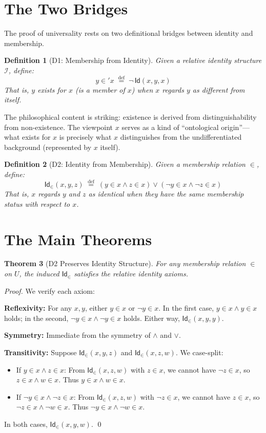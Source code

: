 \documentclass[11pt, a4paper]{article}
\newtheorem{theorem}{Theorem}[section]
\newtheorem{definition}[theorem]{Definition}
\theoremstyle{remark}
\newcommand{\Id}{\mathsf{Id}}
\newcommand{\RI}{\mathcal{I}}
\begin{document}
\section{The Two Bridges}

The proof of universality rests on two definitional bridges between identity and membership.

\begin{definition}[D1: Membership from Identity]
Given a relative identity structure $\RI$, define:
\[
y \in' x \;\stackrel{\text{def}}{=}\; \neg\, \Id(x, y, x)
\]
That is, $y$ exists for $x$ (is a member of $x$) when $x$ regards $y$ as \emph{different from itself}.
\end{definition}

The philosophical content is striking: existence is derived from distinguishability from non-existence. The viewpoint $x$ serves as a kind of ``ontological origin''---what exists for $x$ is precisely what $x$ distinguishes from the undifferentiated background (represented by $x$ itself).

\begin{definition}[D2: Identity from Membership]
Given a membership relation $\in$, define:
\[
\Id_\in(x, y, z) \;\stackrel{\text{def}}{=}\; (y \in x \land z \in x) \lor (\neg y \in x \land \neg z \in x)
\]
That is, $x$ regards $y$ and $z$ as identical when they have the same membership status with respect to $x$.
\end{definition}

\section{The Main Theorems}

\begin{theorem}[D2 Preserves Identity Structure]
\label{thm:d2-preserves}
For any membership relation $\in$ on $U$, the induced $\Id_\in$ satisfies the relative identity axioms.
\end{theorem}

\begin{proof}
We verify each axiom:

\textbf{Reflexivity:} For any $x, y$, either $y \in x$ or $\neg y \in x$. In the first case, $y \in x \land y \in x$ holds; in the second, $\neg y \in x \land \neg y \in x$ holds. Either way, $\Id_\in(x, y, y)$.

\textbf{Symmetry:} Immediate from the symmetry of $\land$ and $\lor$.

\textbf{Transitivity:} Suppose $\Id_\in(x, y, z)$ and $\Id_\in(x, z, w)$. We case-split:
\begin{itemize}
    \item If $y \in x \land z \in x$: From $\Id_\in(x, z, w)$ with $z \in x$, we cannot have $\neg z \in x$, so $z \in x \land w \in x$. Thus $y \in x \land w \in x$.
    \item If $\neg y \in x \land \neg z \in x$: From $\Id_\in(x, z, w)$ with $\neg z \in x$, we cannot have $z \in x$, so $\neg z \in x \land \neg w \in x$. Thus $\neg y \in x \land \neg w \in x$.
\end{itemize}
In both cases, $\Id_\in(x, y, w)$.
\qed
\end{proof}
\end{document}
